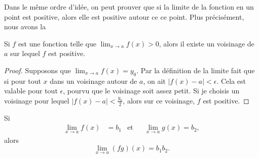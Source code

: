 Dans le même ordre d'idée, on peut prouver que si la limite de la fonction en un point est positive, alors elle est positive autour ce ce point. Plus précisément, nous avons la
\begin{proposition} \label{PropoLimPosFPos}
    Si $f$ est une fonction telle que $\lim_{x\to a}f(x)>0$, alors il existe un voisinage de $a$ sur lequel $f$ est positive.
\end{proposition}

\begin{proof}
    Supposons que $\lim_{x\to a}f(x)=y_0$. Par la définition de la limite fait que si pour tout $x$ dans un voisinage autour de $a$, on ait $| f(x)-a |<\epsilon$. Cela est valable pour tout $\epsilon$, pourvu que le voisinage soit assez petit. Si je choisis un voisinage pour lequel $| f(x)-a |<\frac{ y_0 }{ 2 }$, alors sur ce voisinage, $f$ est positive.
\end{proof}

\begin{theorem}     \label{Tholimfgabab}
    Si
    \begin{align}
        \lim_{x\to a}f(x)&=b_1&\text{et}&&\lim_{x\to a}g(x)=b_2,
    \end{align}
    alors
    \begin{equation}
        \lim_{x\to a}(fg)(x)=b_1b_2.
    \end{equation}
\end{theorem}

